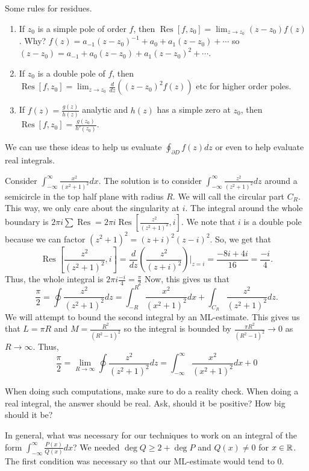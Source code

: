 \documentclass[11pt,leqno,oneside]{amsart}
\newcommand{\Res}{\operatorname{Res}}
\begin{document}
  Some rules for residues.
  \begin{enumerate}
  \item If $z_0$ is a simple pole of order $f$, then $\Res[f,z_0] =
    \lim_{z \to z_0} (z-z_0)f(z)$. Why? $f(z) = a_{-1}(z-z_0)^{-1} +
    a_0 + a_1(z-z_0) + \cdots$ so $(z-z_0) = a_{-1} + a_0(z-z_0) +
    a_1(z-z_0)^2 + \cdots$.
  \item If $z_0$ is a double pole of $f$, then $\Res[f,z_0] = \lim_{z
      \to z_0} \frac{d}{dz}((z-z_0)^2f(z))$ etc for higher order
    poles.
  \item If $f(z) = \frac{g(z)}{h(z)}$ analytic and $h(z)$ has a simple
    zero at $z_0$, then $\Res[f,z_0] = \frac{g(z_0)}{h'(z_0)}$.
  \end{enumerate}
  We can use these ideas to help us evaluate $\oint_{\partial D}
  f(z)dz$ or even to help evaluate real integrals.
  \begin{example}
    Consider $\int_{-\infty}^\infty \frac{x^2}{(x^2+1)^2}dx$. The
    solution is to consider $\int_{-\infty}^\infty
    \frac{z^2}{(z^2+1)^2}dz$ around a semicircle in the top half plane
    with radius $R$. We will call the circular part $C_R$. This way,
    we only care about the singularity at $i$. The integral around the
    whole boundary is $2 \pi i \sum \Res = 2 \pi i \Res[
    \frac{z^2}{(z^2+1)^2}, i]$. We note that $i$ is a double pole
    because we can factor $(z^2+1)^2 = (z+i)^2(z-i)^2$. So, we get
    that \[
      \Res[\frac{z^2}{(z^2+1)^2},i] = \frac{d}{dz}
    \left(
      \frac{z^2}{(z+i)^2}
    \right)|_{z=i} = \frac{-8i+4i}{16} = \frac{-i}{4}.
  \] Thus, the whole integral is $2 \pi i \frac{-i}{4} =
  \frac{\pi}{2}$
  Now, this gives us that \[
    \frac{\pi}{2} = \oint \frac{z^2}{(z^2+1)^2}dz = \int_{-R}^R
    \frac{x^2}{(x^2+1)^2}dx + \int_{C_R} \frac{z^2}{(z^2+1)^2}dz.
  \]
  We will attempt to bound the second integral by an ML-estimate. This
  gives us that $L = \pi R$ and $M = \frac{R^2}{(R^2-1)^2}$ so the
  integral is bounded by $\frac{\pi R^2}{(R^2-1)^2} \to 0$ as $R \to
  \infty$. Thus, \[
    \frac{\pi}{2} = \lim_{R \to \infty} \oint \frac{z^2}{(z^2+1)^2} dz =
    \int_{-\infty}^\infty \frac{x^2}{(x^2+1)^2}dx + 0
  \]
  \end{example}
  When doing such computations, make sure to do a reality check. When
  doing a real integral, the answer should be real. Ask, should it be
  positive? How big should it be?

  In general, what was necessary for our techniques to work on an
  integral of the form $\int_{-\infty}^\infty \frac{P(x)}{Q(x)}dx$? We
  needed $\operatorname{deg} Q \geq 2 + \operatorname{deg} P$ and
  $Q(x) \neq 0$ for $x \in {\mathbb R}$. The first condition was necessary so that our
  ML-estimate would tend to 0.
\end{document}
